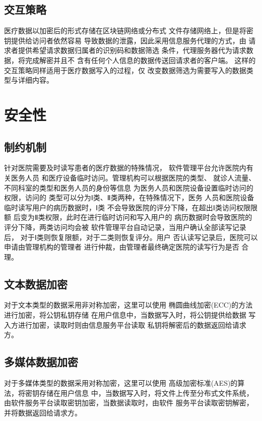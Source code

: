 \documentclass[UTF8]{ctexart}
\begin{document}
    \subsection{交互策略}
    \par
    医疗数据以加密后的形式存储在区块链网络或分布式
    文件存储网络上，但是将密钥提供给访问者依然容易
    导致数据的泄露，因此采用信息服务代理的方式，由
    请求者提供希望请求数据归属者的识别码和数据筛选
    条件，代理服务器代为请求数据，将完成解密并且不
    含有任何个人信息的数据传送回请求者的客户端。
    这样的交互策略同样适用于医疗数据写入的过程，仅
    改变数据筛选为需要写入的数据类型与详细内容。

    \section{安全性}
    \subsection{制约机制}
    \par
    针对医院需要及时读写患者的医疗数据的特殊情况，
    软件管理平台允许医院内有关医务人员
    和医疗设备临时访问。管理机构可以根据医院的类型、
    就诊人流量、不同科室的类型和医务人员的身份等信息
    为医务人员和医院设备设置临时访问的权限，访问的
    类型可以分为Ⅰ类、Ⅱ类两种，在特殊情况下，医务
    人员和医院设备临时读写用户的病历数据时，Ⅰ类
    不会导致医院的评分下降，在超出Ⅰ类访问权限限额
    后变为Ⅱ类权限，此时在进行临时访问和写入用户的
    病历数据时会导致医院的评分下降，两类访问均会被
    软件管理平台自动记录，当用户确认全部读写记录后，
    对于Ⅰ类则恢复限额，对于二类则恢复评分。用户
    否认读写记录后，医院可以申请由管理机构的管理者
    进行仲裁，由管理者最终确定医院的读写行为是否
    合理。
    \subsection{文本数据加密}
    \par
    对于文本类型的数据采用非对称加密，这里可以使用
    椭圆曲线加密(ECC)的方法进行加密，将公钥私钥存储
    在用户信息中，当数据写入时，将公钥提供给数据
    写入方进行加密，读取时则由信息服务平台读取
    私钥将解密后的数据返回给请求方。
    \subsection{多媒体数据加密}
    \par
    对于多媒体类型的数据采用对称加密，这里可以使用
    高级加密标准(AES)的算法，将密钥存储在用户信息
    中，当数据写入时，将文件上传至分布式文件系统，
    由软件服务平台读取密钥加密，当数据读取时，由软件
    服务平台读取密钥解密，并将数据返回给请求方。
\end{document}

